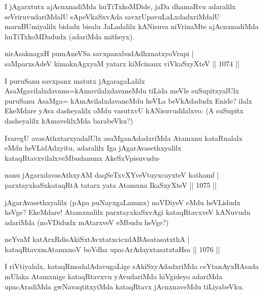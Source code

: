 \begin{artha}
I jAgarxtutx ajAcnxnadiMda huTiTxkoMDide, jaDa dhamaRvu adaralilx seVriruvudariMdalU sApeVkaSxvAda savxrUpavuLaLxdadxriMdalU maruBUmiyalilx bidadx bisalu JaLadalilx kANisuva niVrinaMte ajAcnxnadiMda huTiTxkoMDadudx (adariMda mitheyx).
\end{artha}

\begin{shl}
nirAsaknagxH pumAneVSa savxpanxbudAdhxnatxyoVrapi | \\
saMparxsAdeV kimaknAgxyaM yatarx kiMcinanx viVkaSxyXteV \hfill||  1074 ||  
\end{shl}

\begin{artha}
I puruSanu savxpanx matutx jAgaragaLalilx AsaMgavilalxdavanu=kAmavilalxdavaneMdu tiLida meVle suSupitxyalUlx puruSanu AsaMga= kAmAvilalxdavaneMdu heVLa beVkAdadudx Enide? ilalx EkeMdare yAva dasheyalilx oMdu vasutxvU kANisuvudilalxvo: (A suSupitx dasheyalilx kAmavelilxMda barabeVku?)
\end{artha}

\begin{artha}
IvaregU avasAthxtarxyadalUlx asaMganAdadxriMda Atamxnu kataRnalalx eMdu heVLidAdxyitu, adaralilx Iga jAgarAvasethxyalilx kataqRtavxvilalxveMbudanunx AkeSxVpisuvudu-
\end{artha}


\begin{shl}
nanu jAgarxdavasAthxyAM daqSeTxvXYveVtuyxcayxteV kathamf | \\
parxtayxkaSxkataqRtA tatarx yata Atamxna IkaSxyXteV \hfill||  1075 ||  
\end{shl}

\begin{artha}
jAgarAvasethxyalilx (pApa puNayxgaLanunx) noVDiyeV eMdu heVLidudx heVge? EkeMdare! Atamxnalilx parxtayxkaSxvAgi kataqRtavxveV kANuvudu adariMda (noVDidudx mAtarxveV eMbudu heVge?)
\end{artha}


\begin{shl}
neYvaM katArxRdisAkiSxtAvxtatxcicxdABAsatasatxthA | \\
kataqRtavxmAtamxnoV boVdha upacArAdayxtasatxtaHsa \hfill||  1076 ||  
\end{shl}

\begin{artha}
I riVtiyalalx, kataqRmodalAdavugaLige sAkiSxyAdadxriMda ceYtanAyxBAsada mUlaka Atamxnige kataqRtavxvu yAvudariMda hiVgideyo adariMda upacAradiMda gwNavaqtitxyiMda kataqRtavx jAcnxnaveMdu tiLiyabeVku.
\end{artha}

